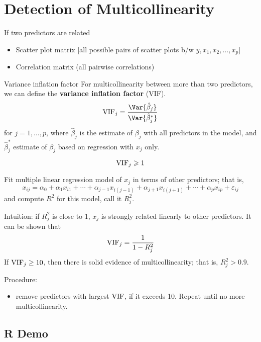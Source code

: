 \section{Detection of Multicollinearity}
If two predictors are related
\begin{itemize}
      \item Scatter plot matrix [all possible pairs of
                        scatter plots b/w $ y,x_1,x_2,\ldots,x_p $]
      \item Correlation matrix (all pairwise correlations)
\end{itemize}
\begin{Definition}{Variance inflation factor}{}
      For multicollinearity between more than two
      predictors, we can define the \textbf{variance inflation factor}
      (VIF).
      \[ \VIF_j=\frac{\Var{\hat{\beta}_j}}{\Var{\hat{\beta}_j^*}} \]
      for $ j=1,\ldots,p $,
      where $ \hat{\beta}_j $ is the estimate of $ \beta_j $ with all predictors
      in the model, and $ \hat{\beta}_j^* $ estimate
      of $ \beta_j $ based on regression with $ x_j $ only.
\end{Definition}
\begin{Theorem}{}{}
      \[ \operatorname{VIF}_j\geqslant 1 \]

\end{Theorem}
Fit multiple linear regression model of $ x_j $ in terms of other predictors;
that is,
\[ x_{i j}=\alpha_0+\alpha_1x_{i1}+\cdots+\alpha_{j-1}x_{i(j-1)}+
      \alpha_{j+1}x_{i(j+1)}+\cdots+\alpha_p x_{i p}+\varepsilon_{ij} \]
and compute $ R^2 $ for this model, call it $ R_j^2 $.

Intuition: if $ R_j^2 $ is close to 1, $ x_j $ is strongly
related linearly to other predictors. It can be shown that
\[ \operatorname{VIF}_j=\frac{1}{1-R_j^2}  \]
If $ \operatorname{VIF}_j\ge 10 $, then there is solid evidence of multicollinearity;
that is, $ R_j^2>0.9 $.

Procedure:
\begin{itemize}
      \item remove predictors with largest $ \operatorname{VIF} $, if it exceeds 10.
            Repeat until no more multicollinearity.
\end{itemize}
\subsection{R Demo}

